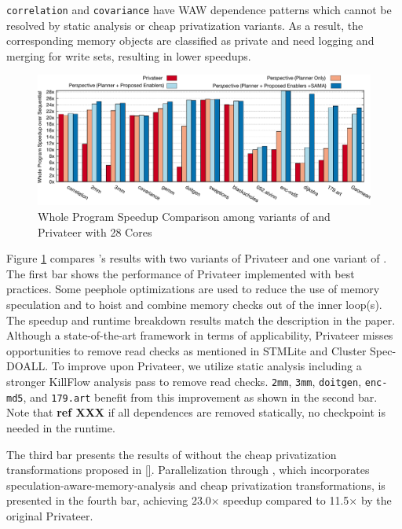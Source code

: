\texttt{correlation} and \texttt{covariance} have WAW
dependence patterns which cannot be resolved by static analysis or cheap
privatization variants. As a result, the corresponding memory objects are
classified as private and need logging and merging for write sets,
resulting in lower speedups.

\begin{figure}[ht]
  \includegraphics[width=\textwidth]{figures/compare-privateer}
  \caption{Whole Program Speedup Comparison among variants of \name and Privateer with 28 Cores}
  \label{fig:speedup-compare}
\end{figure}

Figure \ref{fig:speedup-compare} compares \namensp's results
 with two
variants of Privateer and one variant of \namensp. The first bar shows the
performance of Privateer implemented with best practices.
Some peephole optimizations are used to reduce the use of memory
speculation and to hoist and combine memory checks out of the inner loop(s).
The speedup and runtime breakdown results match the description in the paper.
Although a state-of-the-art framework in terms of applicability, Privateer
misses opportunities to remove read checks as mentioned in
STMLite\cite{mehrara:09:stmlite} and Cluster Spec-DOALL\cite{kim:12:cgo}. To
improve upon Privateer, we utilize static analysis
including a stronger KillFlow analysis pass to remove read checks.
\texttt{2mm}, \texttt{3mm}, \texttt{doitgen}, \texttt{enc-md5}, and
\texttt{179.art} benefit from this improvement as shown in the second bar.
Note that \textbf{ref XXX} if all dependences are removed statically, no
checkpoint is needed in the runtime.

The third bar presents the results of \name without the cheap
privatization transformations proposed in \ref{}. Parallelization through
\name, which incorporates speculation-aware-memory-analysis and cheap
privatization transformations, is presented in the fourth bar, achieving
23.0$\times$ speedup compared to 11.5$\times$ by the original Privateer.



